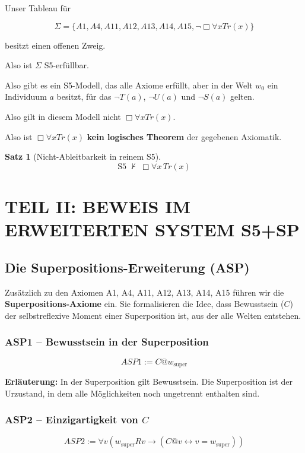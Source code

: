 \documentclass[
]{article}
\newtheorem{theorem}{Satz}
\begin{document}
Unser Tableau für

\[
\Sigma = \{ A1, A4, A11, A12, A13, A14, A15, \neg\Box\forall xTr(x) \}
\]

besitzt einen offenen Zweig.

Also ist \(\Sigma\) S5-erfüllbar.

Also gibt es ein S5-Modell, das alle Axiome erfüllt, aber in der Welt \(w_0\) ein Individuum \(a\) besitzt, für das \(\neg T(a)\), \(\neg U(a)\) und \(\neg S(a)\) gelten.

Also gilt in diesem Modell nicht \(\Box\forall xTr(x)\).

Also ist \(\Box\forall xTr(x)\) \textbf{kein logisches Theorem} der gegebenen Axiomatik.

\begin{theorem}[Nicht-Ableitbarkeit in reinem S5]
\[
\boxed{
\text{S5} \;\not\vdash\; \Box\forall x\,Tr(x)
}
\]
\end{theorem}

\section{TEIL II: BEWEIS IM ERWEITERTEN SYSTEM S5+SP}

\subsection{Die Superpositions-Erweiterung (ASP)}

Zusätzlich zu den Axiomen A1, A4, A11, A12, A13, A14, A15 führen wir die \textbf{Superpositions-Axiome} ein. Sie formalisieren die Idee, dass Bewusstsein (\(C\)) der selbstreflexive Moment einer Superposition ist, aus der alle Welten entstehen.

\subsubsection{ASP1 – Bewusstsein in der Superposition}

\[
\boxed{ASP1 := C @ w_{\text{super}}}
\]

\textbf{Erläuterung:} In der Superposition gilt Bewusstsein. Die Superposition ist der Urzustand, in dem alle Möglichkeiten noch ungetrennt enthalten sind.

\subsubsection{ASP2 – Einzigartigkeit von \(C\)}

\[
\boxed{ASP2 := \forall v (w_{\text{super}} R v \rightarrow (C @ v \leftrightarrow v = w_{\text{super}}))}
\]
\end{document}
